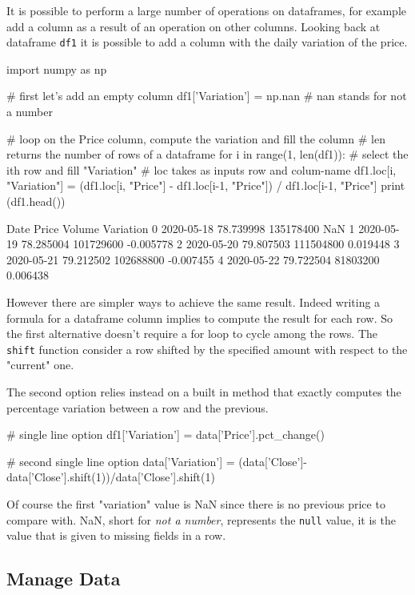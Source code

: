 It is possible to perform a large number of operations on dataframes, for example add a column as a result of an operation on other columns. 
Looking back at dataframe \texttt{df1} it is possible to add a column with the daily variation of the price.

\begin{ipython}
import numpy as np

# first let's add an empty column
df1['Variation'] = np.nan # nan stands for not a number

# loop on the Price column, compute the variation and fill the column
# len returns the number of rows of a dataframe
for i in range(1, len(df1)):
    # select the ith row and fill "Variation"
    # loc takes as inputs row and colum-name
    df1.loc[i, "Variation"] = (df1.loc[i, "Price"] - df1.loc[i-1, "Price"]) /
        df1.loc[i-1, "Price"]
print (df1.head())
\end{ipython}
\begin{ioutput}
        Date      Price     Volume  Variation
0 2020-05-18  78.739998  135178400        NaN
1 2020-05-19  78.285004  101729600  -0.005778
2 2020-05-20  79.807503  111504800   0.019448
3 2020-05-21  79.212502  102688800  -0.007455
4 2020-05-22  79.722504   81803200   0.006438	
\end{ioutput}
\noindent
However there are simpler ways to achieve the same result. Indeed writing a formula for a dataframe column implies to compute the result for each row. So the first alternative doesn't require a for loop to cycle among the rows. The \texttt{shift} function consider a row shifted by the specified amount with respect to the "current" one.

The second option relies instead on a built in method that exactly computes the percentage variation between a row and the previous.

\begin{ipython}
# single line option
df1['Variation'] = data['Price'].pct_change()

# second single line option
data['Variation'] =  (data['Close']-data['Close'].shift(1))/data['Close'].shift(1)
\end{ipython}

Of course the first "variation" value is NaN since there is no previous price to compare with. NaN, short for \emph{not a number}, represents the \texttt{null} value, it is the value that is given to missing fields in a row. 

\subsection{Manage Data}\label{manage-data}

